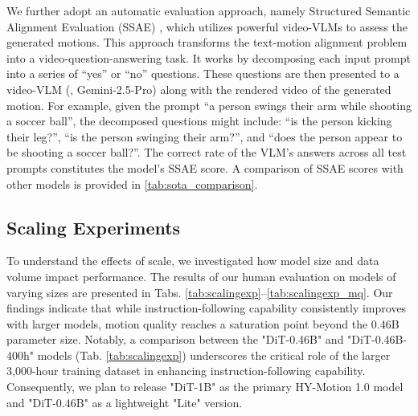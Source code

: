 We further adopt an automatic evaluation approach, namely Structured Semantic Alignment Evaluation (SSAE) \cite{cao2025hunyuanimage}, which utilizes powerful video-VLMs to assess the generated motions. This approach transforms the text-motion alignment problem into a video-question-answering task. It works by decomposing each input prompt into a series of ``yes'' or ``no'' questions. These questions are then presented to a video-VLM (\eg, Gemini-2.5-Pro) along with the rendered video of the generated motion. For example, given the prompt ``a person swings their arm while shooting a soccer ball'', the decomposed questions might include: ``is the person kicking their leg?'', ``is the person swinging their arm?'', and ``does the person appear to be shooting a soccer ball?''. The correct rate of the VLM's answers across all test prompts constitutes the model's SSAE score. A comparison of SSAE scores with other models is provided in \cref{tab:sota_comparison}.






\subsection{Scaling Experiments}
\label{subsec:ablation}

To understand the effects of scale, we investigated how model size and data volume impact performance. The results of our human evaluation on models of varying sizes are presented in Tabs. \ref{tab:scalingexp}–\ref{tab:scalingexp_mq}. Our findings indicate that while instruction-following capability consistently improves with larger models, motion quality reaches a saturation point beyond the 0.46B parameter size. Notably, a comparison between the "DiT-0.46B" and "DiT-0.46B-400h" models (Tab. \ref{tab:scalingexp}) underscores the critical role of the larger 3,000-hour training dataset in enhancing instruction-following capability. Consequently, we plan to release "DiT-1B" as the primary HY-Motion 1.0 model and "DiT-0.46B" as a lightweight "Lite" version.


